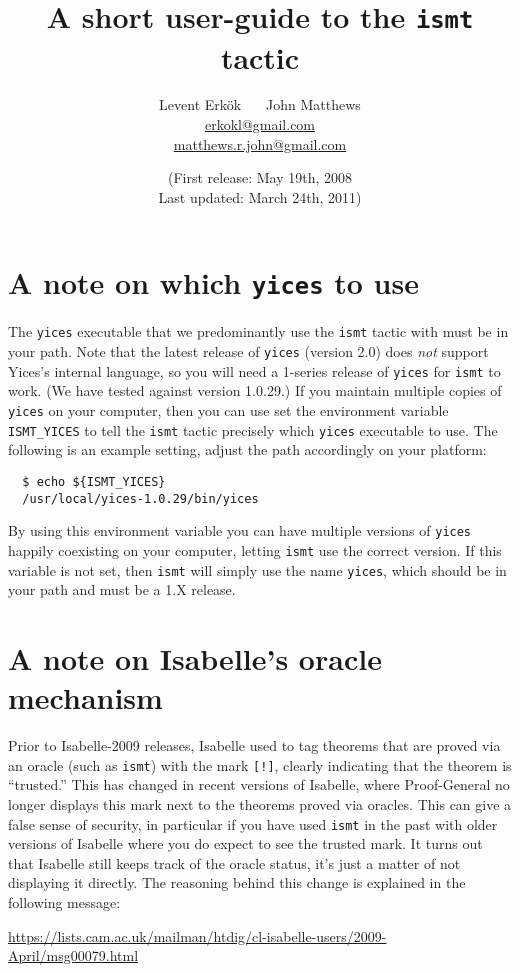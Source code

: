 \documentclass{article}
\title{A short user-guide to the {\tt ismt} tactic}
\author{
Levent Erk\"{o}k $\;\;\;\;$
John Matthews\\
\url{erkokl@gmail.com}\\
\url{matthews.r.john@gmail.com}\\$ $\\
}
\date{(First release: May 19th, 2008\\\vspace*{1mm}
Last updated: March 24th, 2011)}
\begin{document}
\maketitle

\tableofcontents
\section{A note on which {\tt yices} to use}
The {\tt yices} executable that we predominantly use the {\tt ismt} tactic with must be in your path.
Note that the latest release of {\tt yices} (version 2.0) does {\em not} support
Yices's internal language, so you will need a 1-series release of {\tt yices} for {\tt ismt} to work. (We have tested
against version 1.0.29.) If you maintain multiple copies of {\tt yices} on your computer, then you can
use set the environment variable {\tt ISMT\_YICES} to tell the {\tt ismt} tactic precisely which {\tt yices}
executable to use. The following is an example setting, adjust the path accordingly on your platform:
\begin{verbatim}
  $ echo ${ISMT_YICES} 
  /usr/local/yices-1.0.29/bin/yices
\end{verbatim}
By using this environment variable you can have multiple versions of {\tt yices} happily coexisting on your computer,
letting {\tt ismt} use the correct version.
If this variable is not set, then {\tt ismt} will simply use the name {\tt yices}, which should be in your path
and must be a 1.X release.

\section{A note on Isabelle's oracle mechanism}
Prior to Isabelle-2009 releases, Isabelle used to tag theorems that are proved via
an oracle (such as {\tt ismt}) with the mark {\tt [!]}, clearly indicating that the
theorem is ``trusted.'' This has changed in recent versions of Isabelle, where Proof-General no longer displays this mark next to the theorems proved via oracles. This can give a false sense of security, in particular if you have used {\tt ismt} in the past with older versions of Isabelle where you do expect to see the trusted mark.
It turns out that Isabelle still keeps track of the oracle status, it's just a
matter of not displaying it directly. The reasoning behind this change is explained in the following
message:

\url{https://lists.cam.ac.uk/mailman/htdig/cl-isabelle-users/2009-April/msg00079.html}
\end{document}
